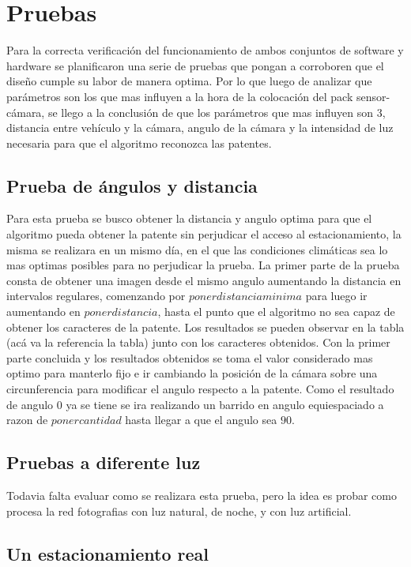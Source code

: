 \section{Pruebas}
Para la correcta verificación del funcionamiento de ambos conjuntos de software y hardware se planificaron una serie de pruebas que pongan a corroboren que el diseño cumple su labor de manera optima.
Por lo que luego de analizar que parámetros son los que mas influyen a la hora de la colocación del pack sensor-cámara, se llego a la conclusión de que los parámetros que mas influyen son 3, distancia entre vehículo y la cámara, angulo de la cámara y la intensidad de luz necesaria para que el algoritmo reconozca las patentes.

\subsection{Prueba de ángulos y distancia}
Para esta prueba se busco obtener la distancia y angulo optima para que el algoritmo pueda obtener la patente sin perjudicar el acceso al estacionamiento, la misma se realizara en un mismo día, en el que las condiciones climáticas sea lo mas optimas posibles para no perjudicar la prueba.
La primer parte de la prueba consta de obtener una imagen desde el mismo angulo aumentando la distancia en intervalos regulares, comenzando por $poner distancia minima$ para luego ir aumentando en $poner distancia$, hasta el punto que el algoritmo no sea capaz de obtener los caracteres de la patente.
Los resultados se pueden observar en la tabla (acá va la referencia la tabla) junto con los caracteres obtenidos.
Con la primer parte concluida y los resultados obtenidos se toma el valor considerado mas optimo para manterlo fijo e ir cambiando la posición de la cámara sobre una circunferencia para modificar el angulo respecto a la patente.
Como el resultado de angulo $0$ ya se tiene se ira realizando un barrido en angulo equiespaciado a razon de $poner cantidad$ hasta llegar a que el angulo sea $90$.


\subsection{Pruebas a diferente luz}

Todavia falta evaluar como se realizara esta prueba, pero la idea es probar como procesa la red fotografias con luz natural, de noche, y con luz artificial.

\subsection{Un estacionamiento real}

